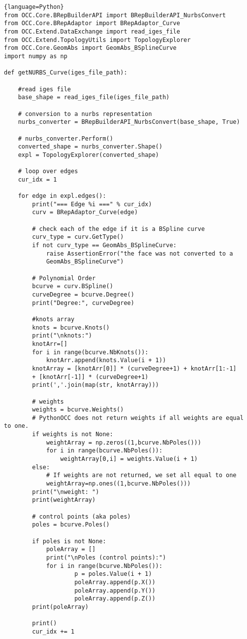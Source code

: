 \lstset{style=python}
\begin{adjustwidth}{-0.5cm}{-0.5cm}
\begin{lstlisting}{language=Python}
from OCC.Core.BRepBuilderAPI import BRepBuilderAPI_NurbsConvert
from OCC.Core.BRepAdaptor import BRepAdaptor_Curve
from OCC.Extend.DataExchange import read_iges_file
from OCC.Extend.TopologyUtils import TopologyExplorer
from OCC.Core.GeomAbs import GeomAbs_BSplineCurve
import numpy as np

def getNURBS_Curve(iges_file_path):
    
    #read iges file
    base_shape = read_iges_file(iges_file_path)
    
    # conversion to a nurbs representation
    nurbs_converter = BRepBuilderAPI_NurbsConvert(base_shape, True)
    
    # nurbs_converter.Perform()
    converted_shape = nurbs_converter.Shape()
    expl = TopologyExplorer(converted_shape)
    
    # loop over edges
    cur_idx = 1

    for edge in expl.edges():
        print("=== Edge %i ===" % cur_idx)
        curv = BRepAdaptor_Curve(edge)
        
        # check each of the edge if it is a BSpline curve
        curv_type = curv.GetType()
        if not curv_type == GeomAbs_BSplineCurve:
            raise AssertionError("the face was not converted to a 
            GeomAbs_BSplineCurve")
        
        # Polynomial Order
        bcurve = curv.BSpline()
        curveDegree = bcurve.Degree()
        print("Degree:", curveDegree)
    
        #knots array
        knots = bcurve.Knots()
        print("\nknots:")
        knotArr=[]
        for i in range(bcurve.NbKnots()):
            knotArr.append(knots.Value(i + 1))
        knotArray = [knotArr[0]] * (curveDegree+1) + knotArr[1:-1] 
        + [knotArr[-1]] * (curveDegree+1)
        print(','.join(map(str, knotArray)))
        
        # weights
        weights = bcurve.Weights()
        # PythonOCC does not return weights if all weights are equal to one.
        if weights is not None:
            weightArray = np.zeros((1,bcurve.NbPoles()))
            for i in range(bcurve.NbPoles()):
                weightArray[0,i] = weights.Value(i + 1)     
        else:
            # If weights are not returned, we set all equal to one
            weightArray=np.ones((1,bcurve.NbPoles()))
        print("\nweight: ")
        print(weightArray)
            
        # control points (aka poles)
        poles = bcurve.Poles()
 
        if poles is not None:
            poleArray = []
            print("\nPoles (control points):")
            for i in range(bcurve.NbPoles()):
                    p = poles.Value(i + 1)
                    poleArray.append(p.X())
                    poleArray.append(p.Y())
                    poleArray.append(p.Z())
        print(poleArray)
        
        print()
        cur_idx += 1
\end{lstlisting}
\end{adjustwidth}
